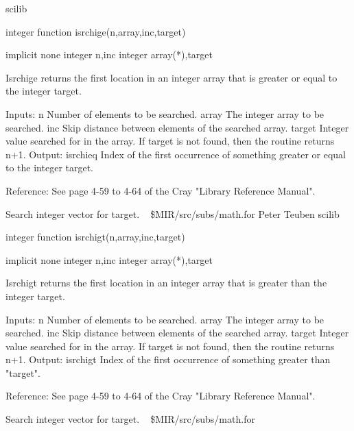 \newline {} scilib
\par{\tenpoint
{\eightpoint\begintt
        integer function isrchige(n,array,inc,target)

        implicit none
        integer n,inc
        integer array(*),target

  Isrchige returns the first location in an integer array that is greater
  or equal to the integer target.

  Inputs:
    n          Number of elements to be searched.
    array      The integer array to be searched.
    inc        Skip distance between elements of the searched array.
    target     Integer value searched for in the array. If target is not
               found, then the routine returns n+1.
  Output:
    isrchieq   Index of the first occurrence of something greater or equal
               to the integer target.

  Reference:
  See page 4-59 to 4-64 of the Cray "Library Reference Manual".
\endtt}
\par}
%
\noindent Search integer vector for target.
\newline \ 
\newline {} \$MIR/src/subs/math.for
\newline {} Peter Teuben
\newline {} scilib
\par{\tenpoint
{\eightpoint\begintt
        integer function isrchigt(n,array,inc,target)

        implicit none
        integer n,inc
        integer array(*),target

  Isrchigt returns the first location in an integer array that is greater than
  the integer target.

  Inputs:
    n          Number of elements to be searched.
    array      The integer array to be searched.
    inc        Skip distance between elements of the searched array.
    target     Integer value searched for in the array. If target is not
               found, then the routine returns n+1.
  Output:
    isrchigt   Index of the first occurrence of something greater than
               "target".

  Reference:
  See page 4-59 to 4-64 of the Cray "Library Reference Manual".
\endtt}
\par}
%
\noindent Search integer vector for target.
\newline \ 
\newline {} \$MIR/src/subs/math.for
